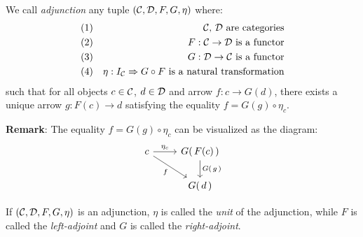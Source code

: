\begin{defin}\label{Adj:def:adjunction}
    We call {\em adjunction} any tuple $(\mbox{$\cal C$},\mbox{$\cal D$},F,G,\eta)$ where:
        \begin{eqnarray*}
            (1)& &\mbox{\mbox{$\cal C$}, \mbox{$\cal D$}\ are categories}\\
            (2)& &\mbox{$F:\mbox{$\cal C$}\to\mbox{$\cal D$}$ is a functor}\\
            (3)& &\mbox{$G:\mbox{$\cal D$}\to\mbox{$\cal C$}$ is a functor}\\
            (4)& &\mbox{$\eta:I_{\cal C}\Rightarrow G\circ F$ is a natural
                transformation}
        \end{eqnarray*}
    such that for all objects $c\in\mbox{$\cal C$}$, $d\in\mbox{$\cal D$}$ and arrow $f:c\to G(d)$, 
    there exists a unique arrow $g:F(c) \to d$ satisfying the equality 
    $f = G(g) \circ \eta_{c}$.
\end{defin}

\noindent
{\bf Remark}: The equality $f = G(g) \circ \eta_{c}$ can be visualized as
the diagram:
    \[
        \begin{tikzcd}
            c \arrow[rd,swap, "f"]\arrow[r,"\eta_{c}"] 
            &G(\,F(c)\,)\arrow[d,"G(\,g\,)"]\\
            & G(\,d\,)
        \end{tikzcd}
    \]

\begin{defin}\label{Adj:def:unit}
    If $(\mbox{$\cal C$},\mbox{$\cal D$},F,G,\eta)$ is an adjunction, $\eta$ is called the {\em unit} of     
    the adjunction, while $F$ is called the {\em left-adjoint} and $G$
    is called the {\em right-adjoint}.
\end{defin}






